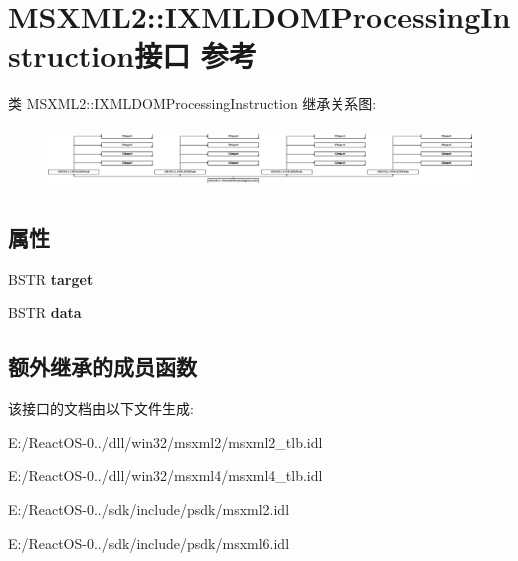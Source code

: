\hypertarget{interface_m_s_x_m_l2_1_1_i_x_m_l_d_o_m_processing_instruction}{}\section{M\+S\+X\+M\+L2\+:\+:I\+X\+M\+L\+D\+O\+M\+Processing\+Instruction接口 参考}
\label{interface_m_s_x_m_l2_1_1_i_x_m_l_d_o_m_processing_instruction}
类 M\+S\+X\+M\+L2\+:\+:I\+X\+M\+L\+D\+O\+M\+Processing\+Instruction 继承关系图\+:\begin{figure}[H]
\begin{center}
\leavevmode
\includegraphics[height=1.615385cm]{interface_m_s_x_m_l2_1_1_i_x_m_l_d_o_m_processing_instruction}
\end{center}
\end{figure}
\subsection*{属性}
\begin{DoxyCompactItemize}
\item 
\mbox{\label{interface_m_s_x_m_l2_1_1_i_x_m_l_d_o_m_processing_instruction_afdb59df34c3503cd2d36814910697bc3}} 
B\+S\+TR {\bfseries target}
\item 
\mbox{\label{interface_m_s_x_m_l2_1_1_i_x_m_l_d_o_m_processing_instruction_a7ee84ce220dac47c89c9ee9c9f0fc1ac}} 
B\+S\+TR {\bfseries data}
\end{DoxyCompactItemize}
\subsection*{额外继承的成员函数}


该接口的文档由以下文件生成\+:\begin{DoxyCompactItemize}
\item 
E\+:/\+React\+O\+S-\/0../dll/win32/msxml2/msxml2\+\_\+tlb.\+idl\item 
E\+:/\+React\+O\+S-\/0../dll/win32/msxml4/msxml4\+\_\+tlb.\+idl\item 
E\+:/\+React\+O\+S-\/0../sdk/include/psdk/msxml2.\+idl\item 
E\+:/\+React\+O\+S-\/0../sdk/include/psdk/msxml6.\+idl\end{DoxyCompactItemize}
